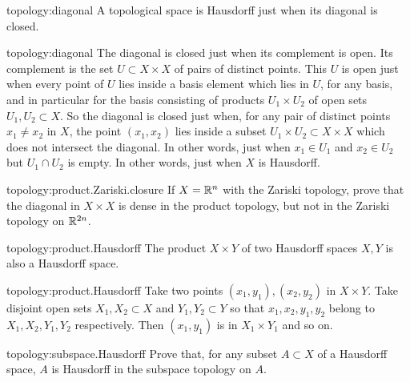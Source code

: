 \begin{problem*}{topology:diagonal}
A topological space is Hausdorff just when its diagonal is closed.
\end{problem*}
\begin{answer}{topology:diagonal}
The diagonal is closed just when its complement is open.
Its complement is the set \(U \subset X \times X\) of pairs of distinct points.
This \(U\) is open just when every point of \(U\) lies inside a basis element which lies in \(U\), for any basis, and in particular for the basis consisting of products \(U_1 \times U_2\) of open sets \(U_1, U_2 \subset X\).
So the diagonal is closed just when, for any pair of distinct points \(x_1 \ne x_2\) in \(X\), the point \((x_1,x_2)\) lies inside a subset \(U_1 \times U_2 \subset X \times X\) which does not intersect the diagonal.
In other words, just when \(x_1 \in U_1\) and \(x_2 \in U_2\) but \(U_1 \cap U_2\) is empty.
In other words, just when \(X\) is Hausdorff.
\end{answer}
\begin{problem}{topology:product.Zariski.closure}
If \(X=\mathbb{R}^{n}\) with the Zariski topology, prove that the diagonal in \(X \times X\) is dense in the product topology, but not in the Zariski topology on \(\mathbb{R}^{2n}\).
\end{problem}
\begin{problem}{topology:product.Hausdorff}
The product \(X \times Y\) of two Hausdorff spaces \(X, Y\) is also a Hausdorff space.
\end{problem}
\begin{answer}{topology:product.Hausdorff}
Take two points \((x_1,y_1), (x_2,y_2)\) in \(X \times Y\).
Take disjoint open sets \(X_1, X_2 \subset X\) and \(Y_1, Y_2 \subset Y\) so that \(x_1, x_2, y_1, y_2\) belong to \(X_1, X_2, Y_1, Y_2 \) respectively.
Then \((x_1,y_1)\) is in \(X_1 \times Y_1\) and so on.
\end{answer}
\begin{problem}{topology:subspace.Hausdorff}
Prove that, for any subset \(A \subset X\) of a Hausdorff space, \(A\) is Hausdorff in the subspace topology on \(A\).
\end{problem}

